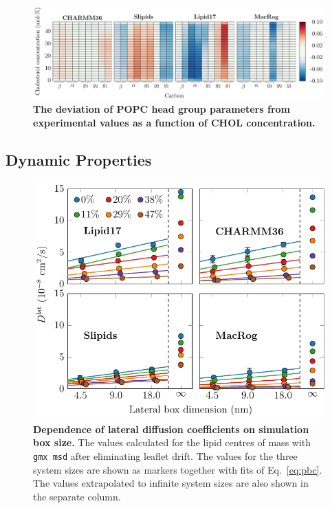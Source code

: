 \documentclass[journal=jpcbfk]{achemso}
\begin{document}
\begin{figure}[htb!]
    \centering
    \includegraphics[width=\linewidth]{../FIGS/OP_headgroup.pdf}
    \caption{\label{SIfig:headgroups}%
     \textbf{The deviation of POPC head group parameters from experimental values as a function of CHOL concentration.}
    }
\end{figure}

\clearpage
\subsection{Dynamic Properties}

\begin{figure}[htb!]
    \centering
    \includegraphics[width=0.9\linewidth]{../FIGS/d_vs_size.pdf}
    \caption{\label{SIfig:dvssize}%
    \textbf{Dependence of lateral diffusion coefficients on simulation box size.} The values calculated for the lipid centres of mass with \texttt{gmx msd} after eliminating leaflet drift. The values for the three system sizes are shown as markers together with fits of Eq.~\eqref{eq:pbc}. The values extrapolated to infinite system sizes are also shown in the separate column. 
    }
\end{figure}
\end{document}
